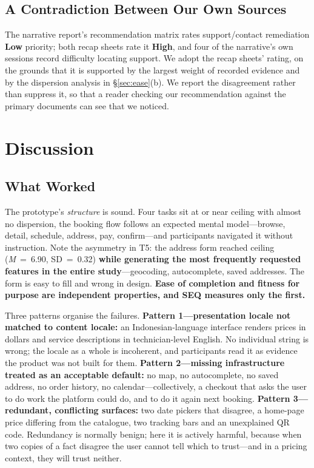 \documentclass[conference]{IEEEtran}
\begin{document}
\subsection{A Contradiction Between Our Own Sources}

The narrative report's recommendation matrix rates support/contact
remediation \textbf{Low} priority; both recap sheets rate it \textbf{High},
and four of the narrative's own sessions record difficulty locating
support. We adopt the recap sheets' rating, on the grounds that it is
supported by the largest weight of recorded evidence and by the dispersion
analysis in \S\ref{sec:ease}(b). We report the disagreement rather than
suppress it, so that a reader checking our recommendation against the
primary documents can see that we noticed.

\section{Discussion}
\label{sec:discussion}

\subsection{What Worked}

The prototype's \emph{structure} is sound. Four tasks sit at or near
ceiling with almost no dispersion, the booking flow follows an expected
mental model---browse, detail, schedule, address, pay, confirm---and
participants navigated it without instruction. Note the asymmetry in T5:
the address form reached ceiling (\emph{M}~=~6.90, SD~=~0.32)
\textbf{while generating the most frequently requested features in the
entire study}---geocoding, autocomplete, saved addresses. The form is easy
to fill and wrong in design. \textbf{Ease of completion and fitness for
purpose are independent properties, and SEQ measures only the first.}

Three patterns organise the failures. \textbf{Pattern 1---presentation
locale not matched to content locale:} an Indonesian-language interface
renders prices in dollars and service descriptions in technician-level
English. No individual string is wrong; the locale as a whole is
incoherent, and participants read it as evidence the product was not built
for them. \textbf{Pattern 2---missing infrastructure treated as an
acceptable default:} no map, no autocomplete, no saved address, no order
history, no calendar---collectively, a checkout that asks the user to do
work the platform could do, and to do it again next booking.
\textbf{Pattern 3---redundant, conflicting surfaces:} two date pickers
that disagree, a home-page price differing from the catalogue, two
tracking bars and an unexplained QR code. Redundancy is normally benign;
here it is actively harmful, because when two copies of a fact disagree
the user cannot tell which to trust---and in a pricing context, they will
trust neither.
\end{document}
